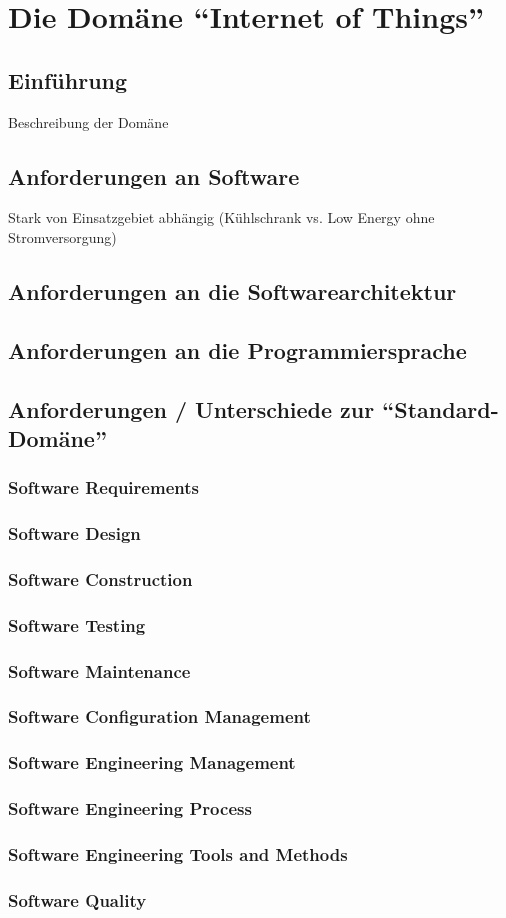 \chapter{Die Domäne "`Internet of Things"'}

\section{Einführung}
Beschreibung der Domäne

\section{Anforderungen an Software}
Stark von Einsatzgebiet abhängig (Kühlschrank vs. Low Energy ohne Stromversorgung)


\section{Anforderungen an die Softwarearchitektur}

\section{Anforderungen an die Programmiersprache}

\section{Anforderungen / Unterschiede zur "`Standard-Domäne"'}
\subsection{Software Requirements}
\subsection{Software Design}
\subsection{Software Construction}
\subsection{Software Testing}
\subsection{Software Maintenance}
\subsection{Software Configuration Management}
\subsection{Software Engineering Management}
\subsection{Software Engineering Process}
\subsection{Software Engineering Tools and Methods}
\subsection{Software Quality}
